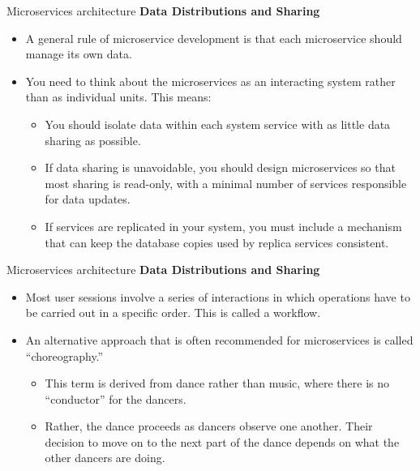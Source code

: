 \documentclass{beamer}
\begin{document}
\begin{frame}{Microservices architecture}
	\textbf{Data Distributions and Sharing}
	\begin{itemize}
		\item A general rule of microservice development is that each microservice should manage its own data. 
		\item You 
		need to think about the microservices as an interacting system rather than as individual units. This means:
		\begin{itemize}
			\item You should isolate data within each system service with as little data sharing as possible.
			\item If data sharing is unavoidable, you should design microservices so that most sharing is read-only, with 
			a minimal number of services responsible for data updates.
			\item If services are replicated in your system, you must include a mechanism that can keep the database 
			copies used by replica services consistent.
		\end{itemize}
	\end{itemize}
\end{frame}
\begin{frame}{Microservices architecture}
	\textbf{Data Distributions and Sharing}
	\begin{itemize}
		\item Most user sessions involve a series of interactions in which operations have to be carried out in a 
		specific order. This is called a workflow. 
		\item An alternative approach that is often recommended for microservices is called “choreography.”
		\begin{itemize}
			\item This 
			term is derived from dance rather than music, where there is no “conductor” for the dancers.
			\item Rather, 
			the dance proceeds as dancers observe one another. Their decision to move on to the next part of the 
			dance depends on what the other dancers are doing.
		\end{itemize}  
	\end{itemize}
\end{frame}
\end{document}
